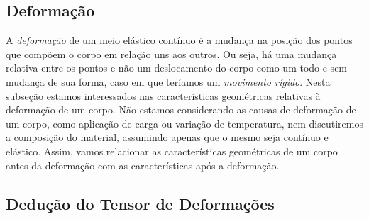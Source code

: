 \subsection{Deforma\c{c}\~ao}

A \textit{deforma\c{c}\~ao} de um meio el\'astico cont\'inuo \'e a mudan\c{c}a na posi\c{c}\~ao dos pontos que comp\~oem o corpo em rela\c{c}\~ao uns aos outros. Ou seja, h\'a uma mudan\c{c}a relativa entre os pontos e n\~ao um deslocamento do corpo como um todo e sem mudan\c{c}a de sua forma, caso em que ter\'iamos um \textit{movimento r\'igido}. Nesta subse\c{c}\~ao estamos interessados nas caracter\'isticas geom\'etricas relativas \`a deforma\c{c}\~ao de um corpo. N\~ao estamos considerando as causas de deforma\c{c}\~ao de um corpo, como aplica\c{c}\~ao de carga ou varia\c{c}\~ao de temperatura, nem discutiremos a composi\c{c}\~ao do material, assumindo apenas que o mesmo seja cont\'inuo e el\'astico. Assim, vamos relacionar as caracter\'isticas geom\'etricas de um corpo antes da deforma\c{c}\~ao com as caracter\'isticas ap\'os a deforma\c{c}\~ao.

\subsection{Dedu\c{c}\~ao do Tensor de Deforma\c{c}\~oes}\label{sec.deriva_deforma}

